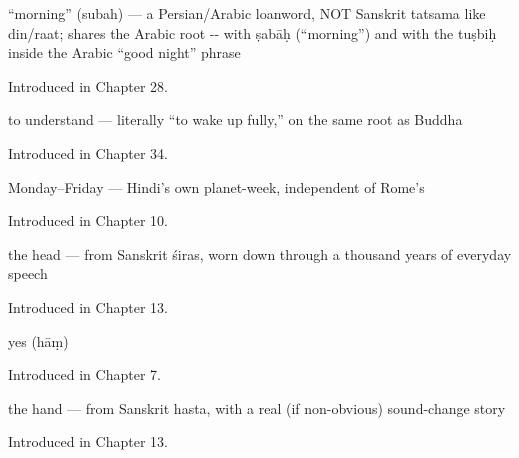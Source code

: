 \noindent\begin{minipage}[t]{\linewidth}
\raggedright
\textbf{}\par
\small \textquotedblleft{}morning\textquotedblright{} (subah) — a Persian/Arabic loanword, NOT Sanskrit tatsama like din/raat; shares the Arabic root -- with ṣabāḥ (\textquotedblleft{}morning\textquotedblright{}) and with the tuṣbiḥ inside the Arabic \textquotedblleft{}good night\textquotedblright{} phrase\par
\footnotesize Introduced in Chapter 28.
\end{minipage}\par\medskip

\noindent\begin{minipage}[t]{\linewidth}
\raggedright
\textbf{}\par
\small to understand — literally \textquotedblleft{}to wake up fully,\textquotedblright{} on the same root as Buddha\par
\footnotesize Introduced in Chapter 34.
\end{minipage}\par\medskip

\noindent\begin{minipage}[t]{\linewidth}
\raggedright
\textbf{    }\par
\small Monday–Friday — Hindi's own planet-week, independent of Rome's\par
\footnotesize Introduced in Chapter 10.
\end{minipage}\par\medskip

\noindent\begin{minipage}[t]{\linewidth}
\raggedright
\textbf{}\par
\small the head — from Sanskrit śiras, worn down through a thousand years of everyday speech\par
\footnotesize Introduced in Chapter 13.
\end{minipage}\par\medskip

\noindent\begin{minipage}[t]{\linewidth}
\raggedright
\textbf{}\par
\small yes (hāṃ)\par
\footnotesize Introduced in Chapter 7.
\end{minipage}\par\medskip

\noindent\begin{minipage}[t]{\linewidth}
\raggedright
\textbf{}\par
\small the hand — from Sanskrit hasta, with a real (if non-obvious) sound-change story\par
\footnotesize Introduced in Chapter 13.
\end{minipage}\par\medskip
